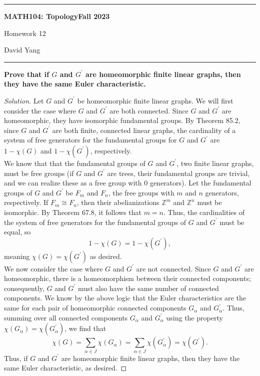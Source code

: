\documentclass[11pt]{article}
\newcommand{\Z}{\mathbb{Z}}
\newenvironment{solution}
  {\renewcommand\qedsymbol{$\blacksquare$}\begin{proof}[Solution]}
  {\end{proof}}
\begin{document}
	\hrule
	\begin{center}
        \textbf{MATH104: Topology}\hfill \textbf{Fall 2023}\newline

		{\Large Homework 12}

		David Yang
	\end{center}

\hrule

\vspace{1em}

\textbf{Prove that if $G$ and $G^{\prime}$ are homeomorphic finite linear graphs, then they have the same Euler characteristic.}

\begin{solution}
Let $G$ and $G^{\prime}$ be homeomorphic finite linear graphs. We will first consider the case where $G$ and $G^{\prime}$ are both connected. 
Since $G$ and $G^{\prime}$ are homeomorphic, they have isomorphic fundamental groups. By Theorem 85.2, 
since $G$ and $G^{\prime}$ are both finite, connected linear graphs, the cardinality of a system of free generators for the fundamental groups for $G$ and $G^{\prime}$ are 
$1 - \chi(G)$ and $1 - \chi(G^{\prime})$, respectively. \\

We know that that the fundamental groups of $G$ and $G^{\prime}$, two finite linear graphs, must be free groups (if $G$ and $G^{\prime}$ are trees, their
fundamental groups are trivial, and we can realize these as a free group with $0$ generators).
Let the fundamental groups of $G$ and $G^{\prime}$ be $F_m$ and $F_n$, the free groups with $m$ and $n$ generators, respectively. If $F_m \cong F_n$, then
their abelianizations $\Z^m$ and $\Z^n$ must be isomorphic. By Theorem 67.8, it follows that $m = n$. Thus, the cardinalities
of the system of free generators for the fundamental groups of $G$ and $G^{\prime}$ must be equal, so
\[
    1 - \chi(G) = 1 - \chi(G^{\prime}),
\]
meaning $\chi(G) = \chi(G^{\prime})$ as desired. \\

We now consider the case where $G$ and $G^{\prime}$ are not connected. Since $G$ and $G^{\prime}$ are homeomorphic, there
is a homeomorphism between their connected components; consequently, $G$ and $G^{\prime}$ must also have the same number of connected components.
We know by the above logic that the Euler characteristics are the same for each pair of homeomorphic connected components $G_\alpha$ and $G^{\prime}_\alpha$.
Thus, summing over all connected components $G_\alpha$ and $G^{\prime}_\alpha$ using the property $\chi(G_\alpha) = \chi(G^{\prime}_\alpha)$, we find that 
\[
    \chi(G) = \sum_{\alpha \in J} \chi(G_\alpha) =  \sum_{\alpha \in J} \chi(G^{\prime}_\alpha) = \chi(G^{\prime}).
\]
Thus, if $G$ and $G^{\prime}$ are homeomorphic finite linear graphs, then they have the same Euler characteristic, as desired.
\end{solution}
\end{document}
